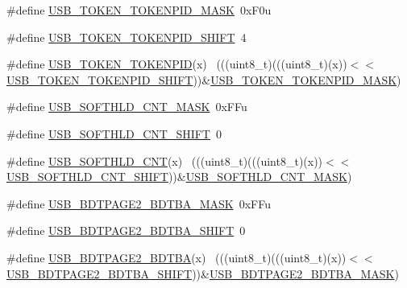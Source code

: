 \begin{DoxyCompactItemize}
\item 
\#define \hyperlink{group___u_s_b___register___masks_ga8880174ec35cfb684d2bcc6e0d5a52bc}{U\+S\+B\+\_\+\+T\+O\+K\+E\+N\+\_\+\+T\+O\+K\+E\+N\+P\+I\+D\+\_\+\+M\+A\+SK}~0x\+F0u
\item 
\#define \hyperlink{group___u_s_b___register___masks_gae410fcf426d2212be6468703734f6ed9}{U\+S\+B\+\_\+\+T\+O\+K\+E\+N\+\_\+\+T\+O\+K\+E\+N\+P\+I\+D\+\_\+\+S\+H\+I\+FT}~4
\item 
\#define \hyperlink{group___u_s_b___register___masks_ga71015e59468e70fbf922c9a784cf4109}{U\+S\+B\+\_\+\+T\+O\+K\+E\+N\+\_\+\+T\+O\+K\+E\+N\+P\+ID}(x)                                    ~(((uint8\+\_\+t)(((uint8\+\_\+t)(x))$<$$<$\hyperlink{group___u_s_b___register___masks_gae410fcf426d2212be6468703734f6ed9}{U\+S\+B\+\_\+\+T\+O\+K\+E\+N\+\_\+\+T\+O\+K\+E\+N\+P\+I\+D\+\_\+\+S\+H\+I\+FT}))\&\hyperlink{group___u_s_b___register___masks_ga8880174ec35cfb684d2bcc6e0d5a52bc}{U\+S\+B\+\_\+\+T\+O\+K\+E\+N\+\_\+\+T\+O\+K\+E\+N\+P\+I\+D\+\_\+\+M\+A\+SK})
\item 
\#define \hyperlink{group___u_s_b___register___masks_gab71f8a7be8b025453facbce8d45b7bcc}{U\+S\+B\+\_\+\+S\+O\+F\+T\+H\+L\+D\+\_\+\+C\+N\+T\+\_\+\+M\+A\+SK}~0x\+F\+Fu
\item 
\#define \hyperlink{group___u_s_b___register___masks_gaf4b663b6276ba642abfdedf79fac92c6}{U\+S\+B\+\_\+\+S\+O\+F\+T\+H\+L\+D\+\_\+\+C\+N\+T\+\_\+\+S\+H\+I\+FT}~0
\item 
\#define \hyperlink{group___u_s_b___register___masks_ga1689293f6962d5a96505e5434314a003}{U\+S\+B\+\_\+\+S\+O\+F\+T\+H\+L\+D\+\_\+\+C\+NT}(x)                                          ~(((uint8\+\_\+t)(((uint8\+\_\+t)(x))$<$$<$\hyperlink{group___u_s_b___register___masks_gaf4b663b6276ba642abfdedf79fac92c6}{U\+S\+B\+\_\+\+S\+O\+F\+T\+H\+L\+D\+\_\+\+C\+N\+T\+\_\+\+S\+H\+I\+FT}))\&\hyperlink{group___u_s_b___register___masks_gab71f8a7be8b025453facbce8d45b7bcc}{U\+S\+B\+\_\+\+S\+O\+F\+T\+H\+L\+D\+\_\+\+C\+N\+T\+\_\+\+M\+A\+SK})
\item 
\#define \hyperlink{group___u_s_b___register___masks_ga69407c90a73a26bc60f3f9b75e4bd7c0}{U\+S\+B\+\_\+\+B\+D\+T\+P\+A\+G\+E2\+\_\+\+B\+D\+T\+B\+A\+\_\+\+M\+A\+SK}~0x\+F\+Fu
\item 
\#define \hyperlink{group___u_s_b___register___masks_gae67d0252b1559f854264f0fe52ff6fb5}{U\+S\+B\+\_\+\+B\+D\+T\+P\+A\+G\+E2\+\_\+\+B\+D\+T\+B\+A\+\_\+\+S\+H\+I\+FT}~0
\item 
\#define \hyperlink{group___u_s_b___register___masks_gad5986a409593f83555e8141e3d569e5f}{U\+S\+B\+\_\+\+B\+D\+T\+P\+A\+G\+E2\+\_\+\+B\+D\+T\+BA}(x)                                    ~(((uint8\+\_\+t)(((uint8\+\_\+t)(x))$<$$<$\hyperlink{group___u_s_b___register___masks_gae67d0252b1559f854264f0fe52ff6fb5}{U\+S\+B\+\_\+\+B\+D\+T\+P\+A\+G\+E2\+\_\+\+B\+D\+T\+B\+A\+\_\+\+S\+H\+I\+FT}))\&\hyperlink{group___u_s_b___register___masks_ga69407c90a73a26bc60f3f9b75e4bd7c0}{U\+S\+B\+\_\+\+B\+D\+T\+P\+A\+G\+E2\+\_\+\+B\+D\+T\+B\+A\+\_\+\+M\+A\+SK})
$$
\end{DoxyCompactItemize}

